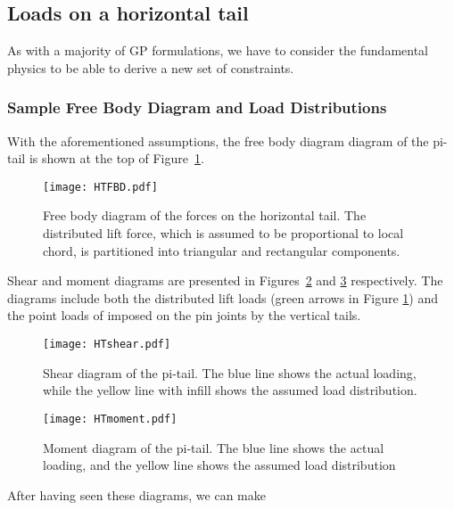 \subsection{Loads on a horizontal tail}
\label{sec:HTloads}

As with a majority of \gls{GP} formulations, we have to consider the fundamental physics to 
be able to derive a new set of constraints. 

\subsubsection{Sample Free Body Diagram and Load Distributions}
\label{s:loadDistributions}

With the aforementioned assumptions, the free body diagram diagram of the 
pi-tail is shown at the top of Figure~\ref{fig:HTFBD}. 

\begin{figure}[!ht]
\centering
\texttt{[image: HTFBD.pdf]}
\caption{Free body diagram of the forces on the horizontal tail. The distributed 
lift force, which is assumed to be proportional to local chord, is partitioned 
into triangular and rectangular components.}
\label{fig:HTFBD}
\end{figure}

Shear and moment diagrams are presented in Figures~\ref{fig:HTshear} and 
\ref{fig:HTmoment} respectively. The diagrams include both the distributed lift 
loads (green arrows in Figure \ref{fig:HTFBD}) and the point loads of imposed on 
the pin joints by the vertical tails.

\begin{figure}[!ht]
    \centering
    \texttt{[image: HTshear.pdf]}
    \caption{Shear diagram of the pi-tail. The blue line shows the actual 
loading, while the yellow line with infill shows the assumed load distribution.}
    \label{fig:HTshear}
\end{figure}

\begin{figure}[!ht]
    \centering
    \texttt{[image: HTmoment.pdf]}
    \caption{Moment diagram of the pi-tail. The blue line shows the actual 
loading, and the yellow line shows the assumed load distribution}
    \label{fig:HTmoment}
\end{figure}

After having seen these diagrams, we can make 

